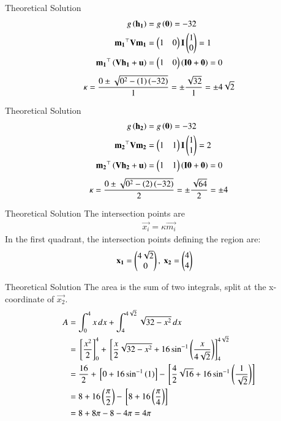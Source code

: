 \documentclass{beamer}
\begin{document}
\begin{frame}{Theoretical Solution}
\begin{align}
    g\left(\mathbf{h_1}\right) &= g\left(\mathbf{0}\right) = -32 \\
    \mathbf{m_1}^\top\mathbf{V}\mathbf{m_1} &= \begin{pmatrix}1&0\end{pmatrix}\mathbf{I}\begin{pmatrix}1\\0\end{pmatrix} = 1 \\
    \mathbf{m_1}^\top\left(\mathbf{V}\mathbf{h_1}+\mathbf{u}\right) &= \begin{pmatrix}1&0\end{pmatrix}\left(\mathbf{I}\mathbf{0}+\mathbf{0}\right) = 0
\end{align}
\begin{align}
    \kappa = \frac{0 \pm \sqrt{0^2 - \left(1\right)\left(-32\right)}}{1} = \pm\frac{\sqrt{32}}{1} = \pm 4\sqrt{2}
\end{align}
\end{frame}

\begin{frame}{Theoretical Solution}
\begin{align}
    g\left(\mathbf{h_2}\right) &= g\left(\mathbf{0}\right) = -32 \\
    \mathbf{m_2}^\top\mathbf{V}\mathbf{m_2} &= \begin{pmatrix}1&1\end{pmatrix}\mathbf{I}\begin{pmatrix}1\\1\end{pmatrix} = 2 \\
    \mathbf{m_2}^\top\left(\mathbf{V}\mathbf{h_2}+\mathbf{u}\right) &= \begin{pmatrix}1&1\end{pmatrix}\left(\mathbf{I}\mathbf{0}+\mathbf{0}\right) = 0
\end{align}
\begin{align}
    \kappa = \frac{0 \pm \sqrt{0^2 - \left(2\right)\left(-32\right)}}{2} = \pm\frac{\sqrt{64}}{2} = \pm 4
\end{align}
\end{frame}

\begin{frame}{Theoretical Solution}
The intersection points are
\begin{align}
    \vec{x_i} = \kappa \vec{m_i}
\end{align}
In the first quadrant, the intersection points defining the region are:
\begin{align}
    \mathbf{x_1} &= \begin{pmatrix}4\sqrt{2} \\ 0\end{pmatrix}, \text{ } \mathbf{x_2} = \begin{pmatrix}4 \\ 4\end{pmatrix}
\end{align}
\end{frame}

\begin{frame}{Theoretical Solution}
The area is the sum of two integrals, split at the x-coordinate of $\vec{x_2}$.
\begin{align}
    A &= \int_{0}^{4} x \, dx + \int_{4}^{4\sqrt{2}} \sqrt{32-x^2} \, dx \\
    &= {}\left[ \frac{x^2}{2} \right]_{0}^{4} + {}\left[ \frac{x}{2}\sqrt{32-x^2} + 16\sin^{-1}\left(\frac{x}{4\sqrt{2}}\right) \right]_{4}^{4\sqrt{2}} \\
    &= \frac{16}{2} + {}\left[ 0 + 16\sin^{-1}\left(1\right) \right] - {}\left[ \frac{4}{2}\sqrt{16} + 16\sin^{-1}\left(\frac{1}{\sqrt{2}}\right) \right] \\
    &= 8 + 16\left(\frac{\pi}{2}\right) - {}\left[ 8 + 16\left(\frac{\pi}{4}\right) \right] \\
    &= 8 + 8\pi - 8 - 4\pi = 4\pi
\end{align}
\end{frame}
\end{document}
